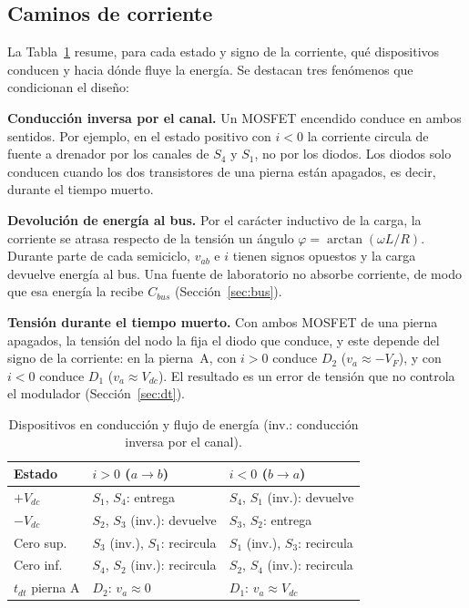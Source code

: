 \documentclass[10pt,twocolumn,letterpaper]{article}
\begin{document}
\subsection{Caminos de corriente}
La Tabla~\ref{tab:caminos} resume, para cada estado y signo de la corriente, qué dispositivos conducen y hacia dónde fluye la energía. Se destacan tres fenómenos que condicionan el diseño:

\textbf{Conducción inversa por el canal.} Un MOSFET encendido conduce en ambos sentidos. Por ejemplo, en el estado positivo con $i<0$ la corriente circula de fuente a drenador por los canales de $S_4$ y $S_1$, no por los diodos. Los diodos solo conducen cuando los dos transistores de una pierna están apagados, es decir, durante el tiempo muerto.

\textbf{Devolución de energía al bus.} Por el carácter inductivo de la carga, la corriente se atrasa respecto de la tensión un ángulo $\varphi=\arctan(\omega L/R)$. Durante parte de cada semiciclo, $v_{ab}$ e $i$ tienen signos opuestos y la carga devuelve energía al bus. Una fuente de laboratorio no absorbe corriente, de modo que esa energía la recibe $C_{bus}$ (Sección~\ref{sec:bus}).

\textbf{Tensión durante el tiempo muerto.} Con ambos MOSFET de una pierna apagados, la tensión del nodo la fija el diodo que conduce, y este depende del signo de la corriente: en la pierna~A, con $i>0$ conduce $D_2$ ($v_a\approx-V_F$), y con $i<0$ conduce $D_1$ ($v_a\approx V_{dc}$). El resultado es un error de tensión que no controla el modulador (Sección~\ref{sec:dt}).

\begin{table}[!t]
\centering
\caption{Dispositivos en conducción y flujo de energía (inv.: conducción inversa por el canal).}
\label{tab:caminos}
\footnotesize
\setlength{\tabcolsep}{2.5pt}
\begin{tabular}{@{}lll@{}}
\toprule
Estado & $i>0$ ($a\to b$) & $i<0$ ($b\to a$) \\
\midrule
$+V_{dc}$ & $S_1$, $S_4$: entrega & $S_4$, $S_1$ (inv.): devuelve \\
$-V_{dc}$ & $S_2$, $S_3$ (inv.): devuelve & $S_3$, $S_2$: entrega \\
Cero sup. & $S_3$ (inv.), $S_1$: recircula & $S_1$ (inv.), $S_3$: recircula \\
Cero inf. & $S_4$, $S_2$ (inv.): recircula & $S_2$, $S_4$ (inv.): recircula \\
$t_{dt}$ pierna A & $D_2$: $v_a\approx 0$ & $D_1$: $v_a\approx V_{dc}$ \\
\bottomrule
\end{tabular}
\end{table}
\end{document}

